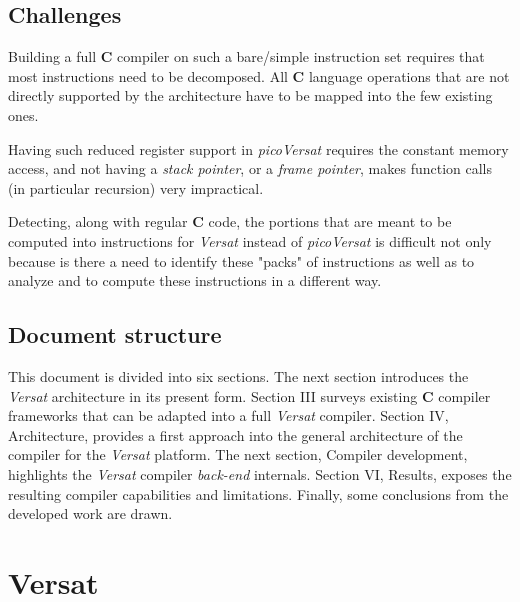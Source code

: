 \documentclass[journal]{IEEEtran}
\begin{document}
\subsection{Challenges}
\label{section:desafio}

Building a full {\bf C} compiler on such a bare/simple instruction set requires
that most instructions need to be decomposed.  All {\bf C} language operations
that are not directly supported by the architecture have to be mapped into the
few existing ones.

Having such reduced register support in {\it picoVersat} requires the constant
memory access, and not having a {\it stack pointer}, or a {\it frame pointer},
makes function calls (in particular recursion) very impractical.

Detecting, along with regular {\bf C} code, the portions that are meant to be
computed into instructions for {\it Versat} instead of {\it picoVersat} is
difficult not only because is there a need to identify these "packs" of
instructions as well as to analyze and to compute these instructions in a
different way.

\subsection{Document structure}
\label{section:parts}

This document is divided into six sections.  The next section introduces the
{\it Versat} architecture in its present form. Section III surveys
existing {\bf C} compiler frameworks that can be adapted into a full
{\it Versat} compiler.  Section IV, Architecture, provides a first approach
into the general architecture of the compiler for the {\it Versat} platform.
The next section, Compiler development, highlights the {\it Versat} compiler
{\it back-end} internals. Section VI, Results, exposes the resulting compiler
capabilities and limitations.
Finally, some conclusions from the developed work are drawn.

\section{Versat}
\label{section:versat}
\end{document}
